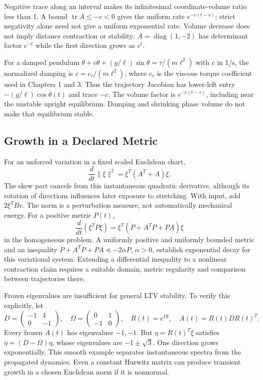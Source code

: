 Negative trace along an interval makes its infinitesimal coordinate-volume ratio less than 1. A bound $\operatorname{tr}A\le-c<0$ gives the uniform rate $e^{-c(t-s)}$; strict negativity alone need not give a uniform exponential rate. Volume decrease does not imply distance contraction or stability: $A=\operatorname{diag}(1,-2)$ has determinant factor $e^{-t}$ while the first direction grows as $e^t$.

For a damped pendulum $\ddot\theta+c\dot\theta+(g/\ell)\sin\theta=\tau/(m\ell^2)$ with $c$ in 1/s, the normalized damping is $c=c_\tau/(m\ell^2)$, where $c_\tau$ is the viscous torque coefficient used in Chapters 1 and 3. Thus the trajectory Jacobian has lower-left entry $-(g/\ell)\cos\bar\theta(t)$ and trace $-c$. The volume factor is $e^{-c(t-s)}$, including near the unstable upright equilibrium. Damping and shrinking phase volume do not make that equilibrium stable.

\subsection{Growth in a Declared Metric}

For an unforced variation in a fixed scaled Euclidean chart,
\begin{equation}
\frac{d}{dt}\|\xi\|^2=\xi^T(A^T+A)\xi.
\end{equation}
The skew part cancels from this instantaneous quadratic derivative, although its rotation of directions influences later exposure to stretching. With input, add $2\xi^TBv$. The norm is a perturbation measure, not automatically mechanical energy. For a positive metric $P(t)$,
\begin{equation}
\frac{d}{dt}(\xi^TP\xi)=\xi^T(\dot P+A^TP+PA)\xi
\end{equation}
in the homogeneous problem. A uniformly positive and uniformly bounded metric and an inequality $\dot P+A^TP+PA\preceq-2\alpha P$, $\alpha>0$, establish exponential decay for this variational system. Extending a differential inequality to a nonlinear contraction claim requires a suitable domain, metric regularity and comparison between trajectories there.

Frozen eigenvalues are insufficient for general LTV stability. To verify this explicitly, let
\begin{equation}
D=\begin{pmatrix}-1&4\\0&-1\end{pmatrix},\quad
\Omega=\begin{pmatrix}0&1\\-1&0\end{pmatrix},\quad
R(t)=e^{\Omega t},\quad A(t)=R(t)DR(t)^T.
\end{equation}
Every frozen $A(t)$ has eigenvalues $-1,-1$. But $\eta=R(t)^T\xi$ satisfies $\dot\eta=(D-\Omega)\eta$, whose eigenvalues are $-1\pm\sqrt3$. One direction grows exponentially. This smooth example separates instantaneous spectra from the propagated dynamics. Even a constant Hurwitz matrix can produce transient growth in a chosen Euclidean norm if it is nonnormal.

